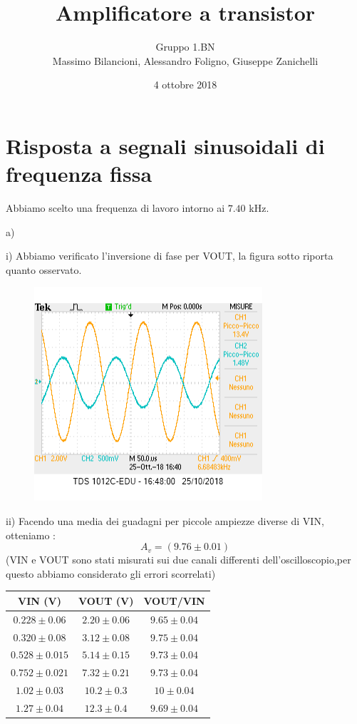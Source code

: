 \documentclass[10pt,a4paper]{article}
\author{Gruppo 1.BN \\ Massimo Bilancioni, Alessandro Foligno, Giuseppe Zanichelli }
\title{Amplificatore a transistor}
\begin{document}
\date{4 ottobre 2018}
\maketitle

\section{Risposta a segnali sinusoidali di frequenza fissa}

Abbiamo scelto una frequenza di lavoro intorno ai $7.40$ \si{\kilo\hertz}.

a) 
\vspace{0.5cm}

i)  Abbiamo verificato l'inversione di fase per VOUT, la figura sotto riporta quanto osservato.

\begin{figure}[h]
	\centering
	\includegraphics[scale=0.5]{oscilloscopio.png}

	
	
\end{figure}

ii)  Facendo una media dei guadagni per piccole  ampiezze diverse di VIN, otteniamo :\[A_v= (9.76\pm0.01) \]
  (VIN e VOUT sono stati misurati sui due canali differenti dell'oscilloscopio,per questo abbiamo considerato gli errori scorrelati)
\begin{table}[h]
	\centering
	\begin{tabular}{|c|c|c|}
		\hline 
		 VIN (\si{\volt}) &  VOUT (\si{\volt})   & VOUT/VIN\\
		\hline 
	$0.228 \pm  0.06 $& $2.20\pm 0.06$& $9.65 \pm 0.04$\\
	$0.320\pm 0.08 $& $3.12 \pm 0.08$& $9.75 \pm0.04$\\
	$0.528\pm 0.015 $& $5.14 \pm 0.15$& $9.73\pm 0.04$ \\
	$0.752\pm 0.021$& $7.32\pm 0.21$ & $9.73\pm 0.04$\\
	$1.02\pm 0.03 $& $10.2\pm 0.3$& $10\pm 0.04 $\\
	$1.27\pm 0.04$ & $12.3\pm 0.4 $& $9.69\pm 0.04 $\\

		\hline 
	\end{tabular} 
\end{table}
\end{document}
